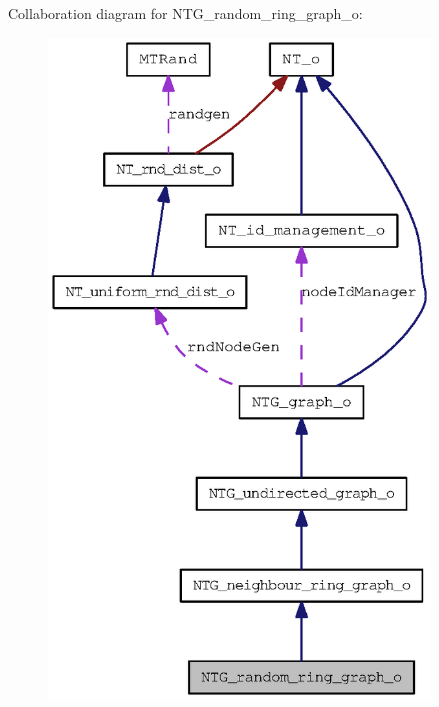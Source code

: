 Collaboration diagram for NTG\_\-random\_\-ring\_\-graph\_\-o:
\nopagebreak
\begin{figure}[H]
\begin{center}
\leavevmode
\includegraphics[width=287pt]{class_n_t_g__random__ring__graph__o__coll__graph}
\end{center}
\end{figure}
